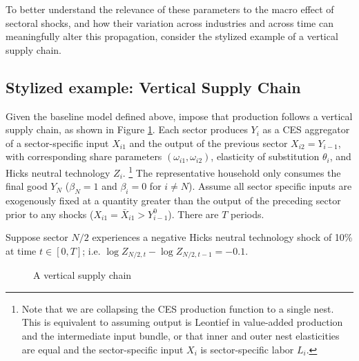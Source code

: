 \documentclass[11pt]{article}
\begin{document}
To better understand the relevance of these parameters to the macro effect of sectoral shocks, and how their variation across industries and across time can meaningfully alter this propagation, consider the stylized example of a vertical supply chain.

\subsection{Stylized example: Vertical Supply Chain}
\label{subsec:stylized_example}

Given the baseline model defined above, impose that production follows a vertical supply chain, as shown in Figure \ref{fig:vertical_chain}. Each sector produces $Y_i$ as a CES aggregator of a sector-specific input $X_{i1}$ and the output of the previous sector $X_{i2} = Y_{i-1}$, with corresponding share parameters $(\omega_{i1}, \omega_{i2})$, elasticity of substitution $\theta_i$, and Hicks neutral technology $Z_i$.  \footnote{Note that we are collapsing the CES production function to a single nest. This is equivalent to assuming output is Leontief in value-added production and the intermediate input bundle, or that inner and outer nest elasticities are equal and the sector-specific input $X_i$ is sector-specific labor $L_i$.} The representative household only consumes the final good $Y_N$ ($\beta_N = 1$ and $\beta_i = 0$ for $i \neq N$). Assume all sector specific inputs are exogenously fixed at a quantity greater than the output of the preceding sector prior to any shocks ($X_{i1} = \bar{X}_{i1} > Y^0_{i-1}$). There are $T$ periods. 

Suppose sector $N/2$ experiences a negative Hicks neutral technology shock of 10\% at time $t \in [0,T]$; i.e. $\log {Z_{N/2,t}} - \log{Z_{N/2,t-1}} = -0.1$.

\begin{figure}[h]
    \centering
    \caption{A vertical supply chain}
    \label{fig:vertical_chain}
\end{figure}
\end{document}
